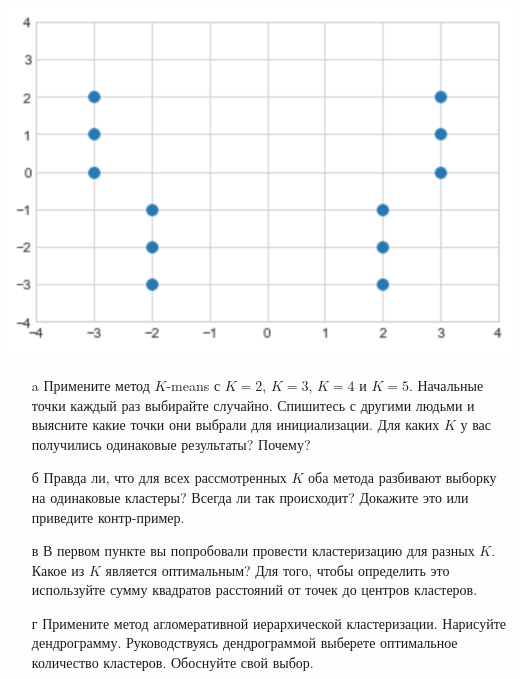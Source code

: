 \documentclass[12pt, a4paper, oneside]{article}
\begin{document}
\begin{center}
	\includegraphics[scale=0.3]{knn_3.png}
\end{center}

\begin{enumerate}
	\item[a] Примените метод $K$-means с $K=2$, $K=3$, $K=4$ и $K=5$. Начальные точки каждый раз выбирайте случайно.  Спишитесь с другими людьми и выясните какие точки они выбрали для инициализации. Для каких $K$ у вас получились одинаковые результаты? Почему?  
	
	\item[б] Правда ли, что для всех рассмотренных $K$ оба метода разбивают выборку на одинаковые кластеры?  Всегда ли так происходит? Докажите это или приведите контр-пример. 
	
	\item[в] В первом пункте вы попробовали провести кластеризацию для разных $K$. Какое из $K$ является оптимальным? Для того, чтобы определить это используйте сумму квадратов расстояний от точек до центров кластеров. 
	
	\item[г] Примените метод агломеративной иерархической кластеризации. Нарисуйте дендрограмму. Руководствуясь дендрограммой выберете оптимальное количество кластеров. Обоснуйте свой выбор.
\end{enumerate}
\end{document}

